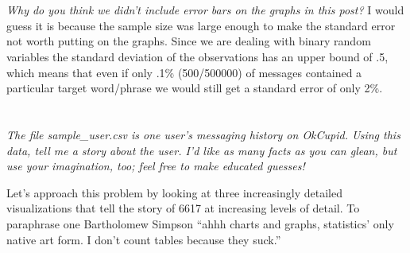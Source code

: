 \documentclass[a4paper,12pt]{article}
\begin{document}
\section{}
\emph{Why do you think we didn't include error bars on the graphs in this post?}
I would guess it is because the sample size was large enough to make the standard error not worth putting on the graphs.  Since we are dealing with binary random variables the standard deviation of the observations has an upper bound of .5, which means that even if only .1\% (500/500000) of messages contained a particular target word/phrase we would still get a standard error of only 2\%.  

\section{}
\emph{The file sample\_user.csv is one user's messaging history on OkCupid. Using this data, tell me a story
about the user. I’d like as many facts as you can glean, but use your imagination, too; feel free to make
educated guesses!}

Let's approach this problem by looking at three increasingly detailed visualizations that tell the story of 6617 at increasing levels of detail.  To paraphrase one Bartholomew Simpson ``ahhh charts and graphs, statistics' only native art form. I don't count tables because they suck.''
\end{document}
